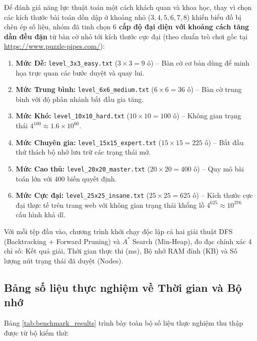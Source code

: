 \documentclass[a4paper]{article}
\begin{document}
Để đánh giá năng lực thuật toán một cách khách quan và khoa học, thay vì chọn các kích thước bài toán dồn dập ở khoảng nhỏ ($3, 4, 5, 6, 7, 8$) khiến biểu đồ bị chèn ép số liệu, nhóm đã tinh chọn \textbf{$6$ cấp độ đại diện với khoảng cách tăng dần đều đặn} từ bàn cờ nhỏ tới kích thước cực đại (theo chuẩn trò chơi gốc tại \url{https://www.puzzle-pipes.com/}):
\begin{enumerate}
    \item \textbf{Mức Dễ:} \texttt{level\_3x3\_easy.txt} ($3 \times 3 = 9$ ô) -- Bàn cờ cơ bản dùng để minh họa trực quan các bước duyệt và quay lui.
    \item \textbf{Mức Trung bình:} \texttt{level\_6x6\_medium.txt} ($6 \times 6 = 36$ ô) -- Bàn cờ trung bình với độ phân nhánh bắt đầu gia tăng.
    \item \textbf{Mức Khó:} \texttt{level\_10x10\_hard.txt} ($10 \times 10 = 100$ ô) -- Không gian trạng thái $4^{100} \approx 1.6 \times 10^{60}$.
    \item \textbf{Mức Chuyên gia:} \texttt{level\_15x15\_expert.txt} ($15 \times 15 = 225$ ô) -- Bắt đầu thử thách bộ nhớ lưu trữ các trạng thái mở.
    \item \textbf{Mức Cao thủ:} \texttt{level\_20x20\_master.txt} ($20 \times 20 = 400$ ô) -- Quy mô bài toán lớn với $400$ biến quyết định.
    \item \textbf{Mức Cực đại:} \texttt{level\_25x25\_insane.txt} ($25 \times 25 = 625$ ô) -- Kích thước cực đại thực tế trên trang web với không gian trạng thái khổng lồ $4^{625} \approx 10^{376}$ cấu hình khả dĩ.
\end{enumerate}

Với mỗi tệp đầu vào, chương trình khởi chạy độc lập cả hai giải thuật DFS (Backtracking + Forward Pruning) và $A^*$ Search (Min-Heap), đo đạc chính xác 4 chỉ số: Kết quả giải, Thời gian thực thi (ms), Bộ nhớ RAM đỉnh (KB) và Số lượng nút trạng thái đã duyệt (Nodes).

\subsection{Bảng số liệu thực nghiệm về Thời gian và Bộ nhớ}
Bảng \ref{tab:benchmark_results} trình bày toàn bộ số liệu thực nghiệm thu thập được từ bộ kiểm thử:
\end{document}

